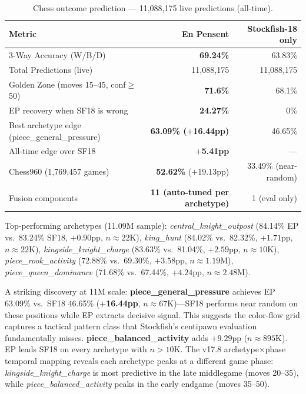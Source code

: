 \documentclass[12pt,a4paper]{article}
\begin{document}
\begin{table}[H]
\centering
\caption{Chess outcome prediction --- 11,088,175 live predictions (all-time).}
\label{tab:chess}
\begin{tabular}{lrr}
\toprule
\textbf{Metric} & \textbf{En Pensent} & \textbf{Stockfish-18 only} \\
\midrule
3-Way Accuracy (W/B/D) & \textbf{69.24\%} & 63.83\% \\
Total Predictions (live) & 11,088,175 & 11,088,175 \\
Golden Zone (moves 15--45, conf$\geq$50) & \textbf{71.6\%} & 68.1\% \\
EP recovery when SF18 is wrong & \textbf{24.27\%} & 0\% \\
Best archetype edge (piece\_general\_pressure) & \textbf{63.09\% ($+$16.44pp)} & 46.65\% \\
All-time edge over SF18 & \textbf{$+$5.41pp} & --- \\
Chess960 (1,769,457 games) & \textbf{52.62\%} ($+$19.13pp) & 33.49\% (near-random) \\
Fusion components & \textbf{11 (auto-tuned per archetype)} & 1 (eval only) \\
\bottomrule
\end{tabular}
\end{table}

Top-performing archetypes (11.09M sample): \textit{central\_knight\_outpost} (84.14\% EP vs.\
83.24\% SF18, $+0.90$pp, $n{\approx}22$K), \textit{king\_hunt} (84.02\% vs.\ 82.32\%, $+1.71$pp,
$n{\approx}22$K), \textit{kingside\_knight\_charge} (83.63\% vs.\ 81.04\%, $+2.59$pp,
$n{\approx}10$K), \textit{piece\_rook\_activity} (72.88\% vs.\ 69.30\%, $+3.58$pp,
$n{\approx}1.19$M), \textit{piece\_queen\_dominance} (71.68\% vs.\ 67.44\%, $+4.24$pp,
$n{\approx}2.48$M).

A striking discovery at 11M scale: \textbf{piece\_general\_pressure} achieves EP 63.09\% vs.\ SF18
46.65\% (\textbf{$+$16.44pp}, $n{\approx}67$K)---SF18 performs near random on these positions
while EP extracts decisive signal. This suggests the color-flow grid captures a tactical pattern
class that Stockfish's centipawn evaluation fundamentally misses. \textbf{piece\_balanced\_activity}
adds $+9.29$pp ($n{\approx}895$K). EP leads SF18 on every archetype with $n{>}10$K. The v17.8
archetype$\times$phase temporal mapping reveals each archetype peaks at a different game phase:
\textit{kingside\_knight\_charge} is most predictive in the late middlegame (moves 20--35), while
\textit{piece\_balanced\_activity} peaks in the early endgame (moves 35--50).
\end{document}

